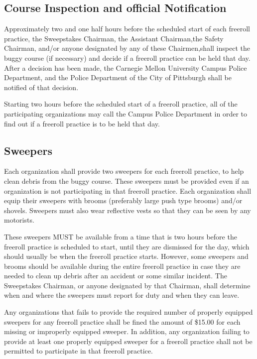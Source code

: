 \documentclass[openany]{book}
\begin{document}
\subsection{Course Inspection and official Notification}

Approximately two and one half hours before the scheduled start of each freeroll practice, the Sweepstakes Chairman, the Assistant Chairman,the Safety Chairman, and/or anyone designated by any of these Chairmen,shall inspect the buggy course (if necessary) and decide if a freeroll practice can be held that day. After a decision has been made, the Carnegie Mellon University Campus Police Department, and the Police Department of the City of Pittsburgh shall be notified of that decision.

Starting two hours before the scheduled start of a freeroll practice, all of the participating organizations may call the Campus Police Department in order to find out if a freeroll practice is to be held that day.

\subsection{Sweepers}

Each organization shall provide two sweepers for each freeroll practice, to help clean debris from the buggy course. These sweepers must be provided even if an organization is not participating in that freeroll practice. Each organization shall equip their sweepers with brooms (preferably large push type brooms) and/or shovels. Sweepers must also wear reflective vests so that they can be seen by any motorists.

These sweepers MUST be available from a time that is two hours before the freeroll practice is scheduled to start, until they are dismissed for the day, which should usually be when the freeroll practice starts. However, some sweepers and brooms should be available during the entire freeroll practice in case they are needed to clean up debris after an accident or some similar incident. The Sweepstakes Chairman, or anyone designated by that Chairman, shall determine when and where the sweepers must report for duty and when they can leave.

Any organizations that fails to provide the required number of properly equipped sweepers for any freeroll practice shall be fined the amount of \$15.00 for each missing or improperly equipped sweeper. In addition, any organization failing to provide at least one properly equipped sweeper for a freeroll practice shall not be permitted to participate in that freeroll practice.
\end{document}
